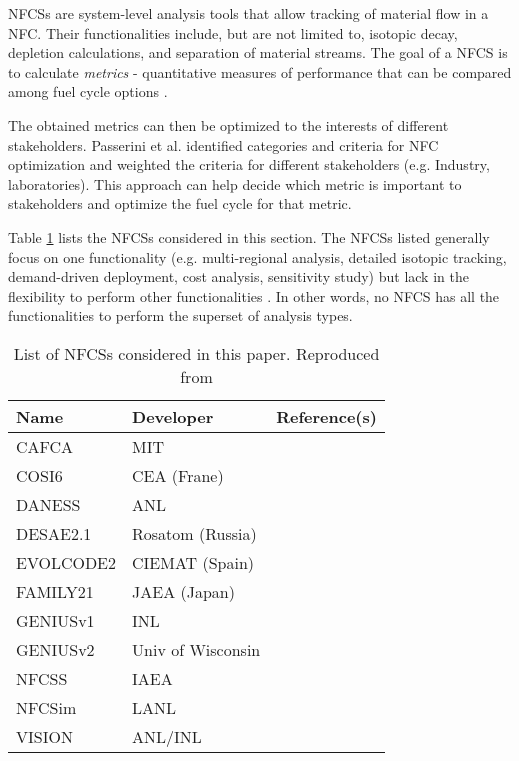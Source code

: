 \glspl{NFCS} are system-level analysis tools
that allow tracking of material flow in a \gls{NFC}. Their
functionalities include, but are not limited to, isotopic decay,
depletion calculations, and separation of material streams.
The goal of a \gls{NFCS} is to calculate \textit{metrics} - quantitative
measures of performance that can be compared among fuel cycle
options \cite{huff_fundamental_2016}.

The obtained metrics can then be optimized to the interests
of different stakeholders. Passerini et al. \cite{passerini_systematic_2017}
identified categories and criteria for \gls{NFC} optimization and
weighted the criteria for different stakeholders (e.g. Industry, laboratories).
This approach can help decide which metric is important to stakeholders
and optimize the fuel cycle for that metric.

Table \ref{tab:fcs} lists the \glspl{NFCS}
considered in this section. The \glspl{NFCS}
listed generally focus on one functionality
(e.g. multi-regional analysis, detailed isotopic tracking,
demand-driven deployment, cost analysis, sensitivity study)
but lack in the flexibility to perform other
functionalities \cite{huff_next_2010}. In
other words, no \gls{NFCS} has all the functionalities to
perform the superset of analysis types.

\begin{table}[h]
    \centering
    \caption{List of \glspl{NFCS} considered in this paper.
             Reproduced from \cite{huff_next_2010}}
    \label{tab:fcs}
    \begin{tabular}{lll}
        \hline
        Name & Developer & Reference(s) \\
        \hline
        CAFCA & MIT & \cite{guerin_benchmark_2009}\\
        COSI6 & CEA (Frane) & \cite{meyer_new_2009} \\
        DANESS & ANL & \cite{van_den_durpel_daness:_2006}\\
        DESAE2.1 & Rosatom (Russia) & \cite{tsibulskiy_desae_2006}\\
        EVOLCODE2 & CIEMAT (Spain) & \cite{alvarez-velarde_validation_2014}\\
        FAMILY21 & JAEA (Japan) & \cite{oecd_nuclear_2009}\\
        GENIUSv1 & INL & \cite{dunzik-gougar_global_2007}\\
        GENIUSv2 & Univ of Wisconsin & \cite{dunn_genius_2009}\\
        NFCSS & IAEA & \cite{iaea_guidance_2008}\\
        NFCSim & LANL & \cite{schneider_nfcsim:_2005} \\
        VISION & ANL/INL & \cite{jacobson_verifiable_2010} \\
        \hline
    \end{tabular}
\end{table}


